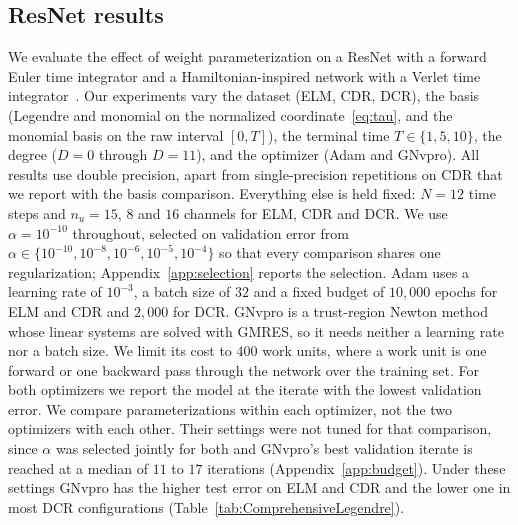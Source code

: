 \documentclass[pdflatex,sn-mathphys-num]{sn-jnl}%
\theoremstyle{thmstyleone}%
\theoremstyle{thmstyletwo}%
\theoremstyle{thmstylethree}%
\begin{document}
\subsection{ResNet results}\label{sect:ResNet_results}

We evaluate the effect of weight parameterization on a ResNet with a forward Euler time integrator and a Hamiltonian-inspired network with a Verlet time integrator~\cite{HaberRuthotto2017}.
%
Our experiments vary the dataset (ELM, CDR, DCR), the basis (Legendre and monomial on the normalized coordinate~\eqref{eq:tau}, and the monomial basis on the raw interval $[0,T]$), the terminal time $T\in\{1,5,10\}$, the degree ($D=0$ through $D=11$), and the optimizer (Adam and GNvpro).
%
All results use double precision, apart from single-precision repetitions on CDR that we report with the basis comparison.
%
Everything else is held fixed: $N=12$ time steps and $n_u=15$, $8$ and $16$ channels for ELM, CDR and DCR.
%
We use $\alpha=10^{-10}$ throughout, selected on validation error from $\alpha\in\{10^{-10},10^{-8},10^{-6},10^{-5},10^{-4}\}$ so that every comparison shares one regularization; Appendix~\ref{app:selection} reports the selection.
%
Adam uses a learning rate of $10^{-3}$, a batch size of $32$ and a fixed budget of $10{,}000$ epochs for ELM and CDR and $2{,}000$ for DCR. GNvpro is a trust-region Newton method whose linear systems are solved with GMRES, so it needs neither a learning rate nor a batch size. We limit its cost to $400$ work units, where a work unit is one forward or one backward pass through the network over the training set. For both optimizers we report the model at the iterate with the lowest validation error.
%
We compare parameterizations within each optimizer, not the two optimizers with each other. Their settings were not tuned for that comparison, since $\alpha$ was selected jointly for both and GNvpro's best validation iterate is reached at a median of $11$ to $17$ iterations (Appendix~\ref{app:budget}). Under these settings GNvpro has the higher test error on ELM and CDR and the lower one in most DCR configurations (Table~\ref{tab:ComprehensiveLegendre}).
\end{document}
